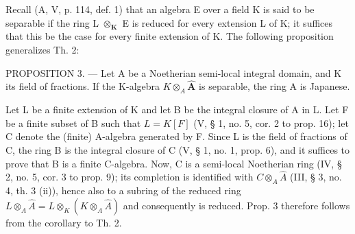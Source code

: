 Recall (A, V, p. 114, def. 1) that an algebra E over a field K is said to be separable if the ring L \(\otimes_{\mathbf{K}}\) E is reduced for every extension L of K; it suffices that this be the case for every finite extension of K. The following proposition generalizes Th. 2:

PROPOSITION 3. --- Let A be a Noetherian semi-local integral domain, and K its field of fractions. If the K-algebra \(K \otimes_{A} \hat{\mathbf{A}}\) is separable, the ring A is Japanese.

Let L be a finite extension of K and let B be the integral closure of A in L. Let F be a finite subset of B such that \(L = K[F]\) (V, § 1, no. 5, cor. 2 to prop. 16); let C denote the (finite) A-algebra generated by F. Since L is the field of fractions of C, the ring B is the integral closure of C (V, § 1, no. 1, prop. 6), and it suffices to prove that B is a finite C-algebra. Now, C is a semi-local Noetherian ring (IV, § 2, no. 5, cor. 3 to prop. 9); its completion is identified with \(C \otimes_{A} \hat{A}\) (III, § 3, no. 4, th. 3 (ii)), hence also to a subring of the reduced ring \(L \otimes_{A} \hat{A} = L \otimes_{K} (K \otimes_{A} \hat{A})\) and consequently is reduced. Prop. 3 therefore follows from the corollary to Th. 2.

